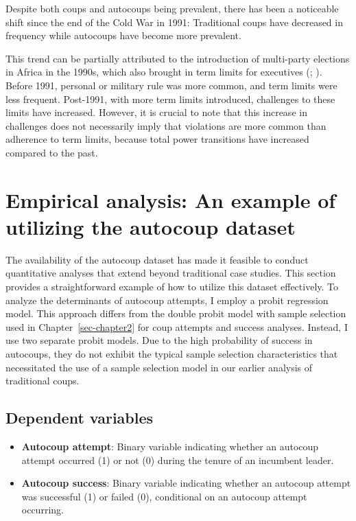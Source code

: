 \documentclass[
  12pt,
]{report}
\begin{document}
Despite both coups and autocoups being prevalent, there has been a
noticeable shift since the end of the Cold War in 1991: Traditional
coups have decreased in frequency while autocoups have become more
prevalent.

This trend can be partially attributed to the introduction of
multi-party elections in Africa in the 1990s, which also brought in term
limits for executives (;
). Before 1991, personal or
military rule was more common, and term limits were less frequent.
Post-1991, with more term limits introduced, challenges to these limits
have increased. However, it is crucial to note that this increase in
challenges does not necessarily imply that violations are more common
than adherence to term limits, because total power transitions have
increased compared to the past.

\section{Empirical analysis: An example of utilizing the autocoup
dataset}\label{empirical-analysis-an-example-of-utilizing-the-autocoup-dataset}

The availability of the autocoup dataset has made it feasible to conduct
quantitative analyses that extend beyond traditional case studies. This
section provides a straightforward example of how to utilize this
dataset effectively. To analyze the determinants of autocoup attempts, I
employ a probit regression model. This approach differs from the double
probit model with sample selection used in Chapter~\ref{sec-chapter2}
for coup attempts and success analyses. Instead, I use two separate
probit models. Due to the high probability of success in autocoups, they
do not exhibit the typical sample selection characteristics that
necessitated the use of a sample selection model in our earlier analysis
of traditional coups.

\subsection{Dependent variables}\label{dependent-variables}

\begin{itemize}
\item
  \textbf{Autocoup attempt}: Binary variable indicating whether an
  autocoup attempt occurred (1) or not (0) during the tenure of an
  incumbent leader.
\item
  \textbf{Autocoup success}: Binary variable indicating whether an
  autocoup attempt was successful (1) or failed (0), conditional on an
  autocoup attempt occurring.
\end{itemize}
\end{document}

